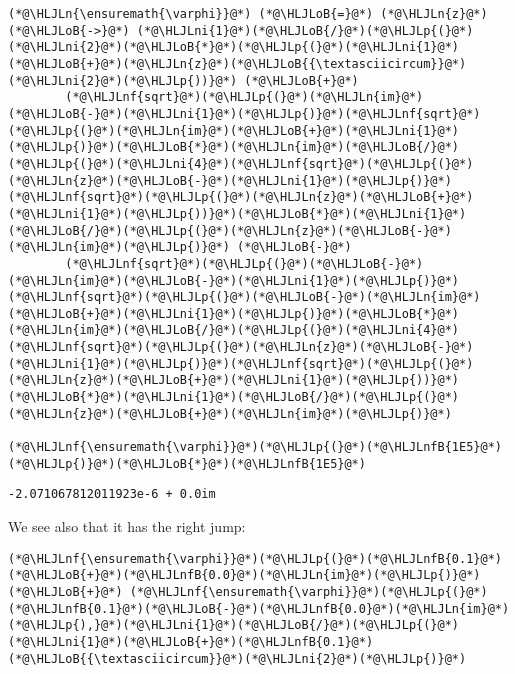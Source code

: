 \documentclass[12pt,landscape]{article}
\newcommand{\HLJLn}[1]{#1}
\newcommand{\HLJLnf}[1]{\textcolor[RGB]{66,102,213}{#1}}
\newcommand{\HLJLnfB}[1]{\textcolor[RGB]{59,151,46}{#1}}
\newcommand{\HLJLni}[1]{\textcolor[RGB]{59,151,46}{#1}}
\newcommand{\HLJLoB}[1]{\textcolor[RGB]{102,102,102}{\textbf{#1}}}
\newcommand{\HLJLp}[1]{#1}
\begin{document}
{\begin{lstlisting}
(*@\HLJLn{\ensuremath{\varphi}}@*) (*@\HLJLoB{=}@*) (*@\HLJLn{z}@*) (*@\HLJLoB{->}@*) (*@\HLJLni{1}@*)(*@\HLJLoB{/}@*)(*@\HLJLp{(}@*)(*@\HLJLni{2}@*)(*@\HLJLoB{*}@*)(*@\HLJLp{(}@*)(*@\HLJLni{1}@*)(*@\HLJLoB{+}@*)(*@\HLJLn{z}@*)(*@\HLJLoB{{\textasciicircum}}@*)(*@\HLJLni{2}@*)(*@\HLJLp{))}@*) (*@\HLJLoB{+}@*)
        (*@\HLJLnf{sqrt}@*)(*@\HLJLp{(}@*)(*@\HLJLn{im}@*)(*@\HLJLoB{-}@*)(*@\HLJLni{1}@*)(*@\HLJLp{)}@*)(*@\HLJLnf{sqrt}@*)(*@\HLJLp{(}@*)(*@\HLJLn{im}@*)(*@\HLJLoB{+}@*)(*@\HLJLni{1}@*)(*@\HLJLp{)}@*)(*@\HLJLoB{*}@*)(*@\HLJLn{im}@*)(*@\HLJLoB{/}@*)(*@\HLJLp{(}@*)(*@\HLJLni{4}@*)(*@\HLJLnf{sqrt}@*)(*@\HLJLp{(}@*)(*@\HLJLn{z}@*)(*@\HLJLoB{-}@*)(*@\HLJLni{1}@*)(*@\HLJLp{)}@*)(*@\HLJLnf{sqrt}@*)(*@\HLJLp{(}@*)(*@\HLJLn{z}@*)(*@\HLJLoB{+}@*)(*@\HLJLni{1}@*)(*@\HLJLp{))}@*)(*@\HLJLoB{*}@*)(*@\HLJLni{1}@*)(*@\HLJLoB{/}@*)(*@\HLJLp{(}@*)(*@\HLJLn{z}@*)(*@\HLJLoB{-}@*)(*@\HLJLn{im}@*)(*@\HLJLp{)}@*) (*@\HLJLoB{-}@*)
        (*@\HLJLnf{sqrt}@*)(*@\HLJLp{(}@*)(*@\HLJLoB{-}@*)(*@\HLJLn{im}@*)(*@\HLJLoB{-}@*)(*@\HLJLni{1}@*)(*@\HLJLp{)}@*)(*@\HLJLnf{sqrt}@*)(*@\HLJLp{(}@*)(*@\HLJLoB{-}@*)(*@\HLJLn{im}@*)(*@\HLJLoB{+}@*)(*@\HLJLni{1}@*)(*@\HLJLp{)}@*)(*@\HLJLoB{*}@*)(*@\HLJLn{im}@*)(*@\HLJLoB{/}@*)(*@\HLJLp{(}@*)(*@\HLJLni{4}@*)(*@\HLJLnf{sqrt}@*)(*@\HLJLp{(}@*)(*@\HLJLn{z}@*)(*@\HLJLoB{-}@*)(*@\HLJLni{1}@*)(*@\HLJLp{)}@*)(*@\HLJLnf{sqrt}@*)(*@\HLJLp{(}@*)(*@\HLJLn{z}@*)(*@\HLJLoB{+}@*)(*@\HLJLni{1}@*)(*@\HLJLp{))}@*)(*@\HLJLoB{*}@*)(*@\HLJLni{1}@*)(*@\HLJLoB{/}@*)(*@\HLJLp{(}@*)(*@\HLJLn{z}@*)(*@\HLJLoB{+}@*)(*@\HLJLn{im}@*)(*@\HLJLp{)}@*)

(*@\HLJLnf{\ensuremath{\varphi}}@*)(*@\HLJLp{(}@*)(*@\HLJLnfB{1E5}@*)(*@\HLJLp{)}@*)(*@\HLJLoB{*}@*)(*@\HLJLnfB{1E5}@*)
\end{lstlisting}

\begin{lstlisting}
-2.071067812011923e-6 + 0.0im
\end{lstlisting}


We see also that it has the right jump:


\begin{lstlisting}
(*@\HLJLnf{\ensuremath{\varphi}}@*)(*@\HLJLp{(}@*)(*@\HLJLnfB{0.1}@*)(*@\HLJLoB{+}@*)(*@\HLJLnfB{0.0}@*)(*@\HLJLn{im}@*)(*@\HLJLp{)}@*) (*@\HLJLoB{+}@*) (*@\HLJLnf{\ensuremath{\varphi}}@*)(*@\HLJLp{(}@*)(*@\HLJLnfB{0.1}@*)(*@\HLJLoB{-}@*)(*@\HLJLnfB{0.0}@*)(*@\HLJLn{im}@*)(*@\HLJLp{),}@*)(*@\HLJLni{1}@*)(*@\HLJLoB{/}@*)(*@\HLJLp{(}@*)(*@\HLJLni{1}@*)(*@\HLJLoB{+}@*)(*@\HLJLnfB{0.1}@*)(*@\HLJLoB{{\textasciicircum}}@*)(*@\HLJLni{2}@*)(*@\HLJLp{)}@*)
\end{lstlisting}

}
\end{document}
